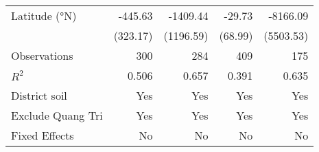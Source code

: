 {\begin{tabular}{l*{4}{D{.}{.}{-1}}}
Latitude (°N)       &     -445.63         &    -1409.44         &      -29.73         &    -8166.09         \\
                    &    (323.17)         &   (1196.59)         &     (68.99)         &   (5503.53)         \\
\midrule
Observations        &         300         &         284         &         409         &         175         \\
\(R^{2}\)           &       0.506         &       0.657         &       0.391         &       0.635         \\
District soil       &         Yes         &         Yes         &         Yes         &         Yes         \\
Exclude Quang Tri   &         Yes         &         Yes         &         Yes         &         Yes         \\
Fixed Effects       &          No         &          No         &          No         &          No         \\
\bottomrule
\end{tabular}
}
